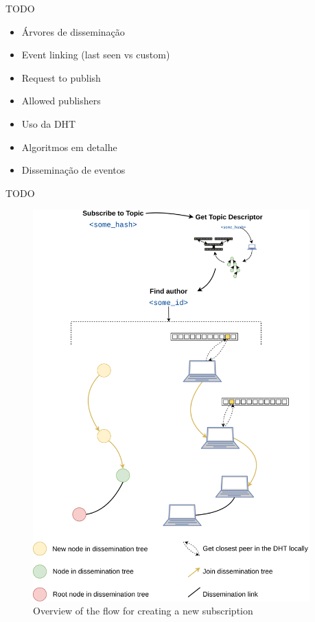 TODO
\begin{itemize}
\item Árvores de disseminação
\item Event linking (last seen vs custom)
\item Request to publish
\item Allowed publishers
\item Uso da DHT
\item Algoritmos em detalhe
\item Disseminação de eventos
\end{itemize}

TODO

\begin{figure}[hb!]
  \centering
  \includegraphics[width=0.95\textwidth]{img/pulsarcast-subscription-flow.png}
  \caption{Overview of the flow for creating a new subscription}
  \label{fig:pulsarcast-subscription-flow}
\end{figure}

